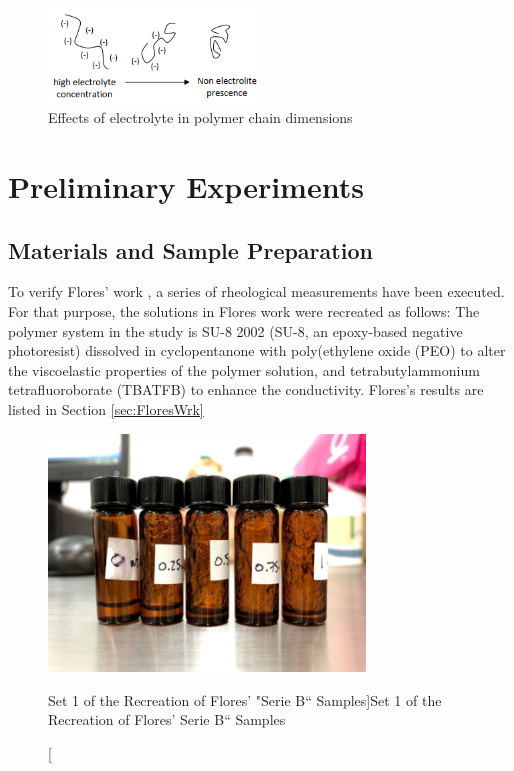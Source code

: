 \begin{figure}[th]
\centering
\includegraphics[width=0.50\textwidth]{./Figures/electrolyteConcentration.png}
\decoRule
\caption[Effects of electrolyte in polymer chain dimensions]{Effects of electrolyte in polymer chain dimensions \cite{Flores2017}}
\label{fig:electrolyteConcentration}
\end{figure}

\section{Preliminary Experiments}

\subsection{Materials and Sample Preparation}

To verify Flores' work \cite{Flores2017}, a series of rheological measurements have been executed. For that purpose, the solutions in Flores work were recreated as follows: The polymer system in the study is SU-8 2002 (SU-8, an epoxy-based negative photoresist) dissolved in cyclopentanone with poly(ethylene oxide (PEO) to alter the viscoelastic properties of the polymer solution, and tetrabutylammonium tetrafluoroborate (TBATFB) to enhance the conductivity. Flores's results are listed in Section \ref{sec:FloresWrk}

\begin{figure}[th]
\centering
\includegraphics[width=0.75\textwidth]{./Figures/PEset1.png}
\decoRule
\caption[Set 1 of the Recreation of Flores' "Serie B`` Samples]{Set 1 of the Recreation of Flores' Serie B`` Samples}
\label{fig:PEset1}
\end{figure}

